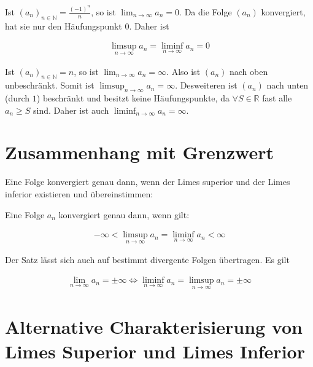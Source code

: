 \documentclass[fontsize=9pt,
               parskip=half-,
               DIV=14,
               listof=chapterentry,
               tocflat]{scrbook}
\begin{document}
\begin{example*}
Ist $(a_{n})_{n\in \mathbb {N} }={\tfrac {(-1)^{n}}{n}}$, so ist $\lim _{n\to \infty }a_{n}=0$. Da die Folge $(a_{n})$ konvergiert, hat sie nur den Häufungspunkt $0$. Daher ist

\begin{align*}
\limsup _{n\to \infty }a_{n}=\liminf _{n\to \infty }a_{n}=0
\end{align*}

\end{example*}

\begin{example*}
Ist $(a_{n})_{n\in \mathbb {N} }=n$, so ist $\lim _{n\to \infty }a_{n}=\infty $. Also ist $(a_{n})$ nach oben unbeschränkt. Somit ist $\limsup _{n\to \infty }a_{n}=\infty $. Desweiteren ist $(a_{n})$ nach unten (durch $1$) beschränkt und besitzt keine Häufungspunkte, da $\forall S\in \mathbb {R} $ fast alle $a_{n}\geq S$ sind. Daher ist auch $\liminf _{n\to \infty }a_{n}=\infty $.

\end{example*}

\section{Zusammenhang mit Grenzwert}

Eine Folge konvergiert genau dann, wenn der Limes superior und der Limes inferior existieren und übereinstimmen:

\begin{theorem*}
Eine Folge $a_{n}$ konvergiert genau dann, wenn gilt:

\begin{align*}
-\infty <\limsup _{n\to \infty }a_{n}=\liminf _{n\to \infty }a_{n}<\infty 
\end{align*}

\end{theorem*}

\begin{hint*}
Der Satz lässt sich auch auf bestimmt divergente Folgen übertragen. Es gilt

\begin{align*}
\lim _{n\to \infty }a_{n}=\pm \infty \iff \liminf _{n\to \infty }a_{n}=\limsup _{n\to \infty }a_{n}=\pm \infty 
\end{align*}

\end{hint*}

\section{Alternative Charakterisierung von Limes Superior und Limes Inferior}
\end{document}

